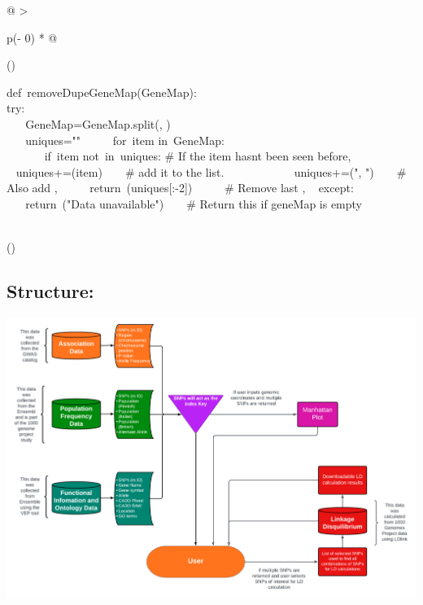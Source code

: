 \documentclass[12pt,a4paper]{article}
\begin{document}
\begin{longtable}[]{@{}
  >{\raggedright\arraybackslash}p{(\columnwidth - 0\tabcolsep) * }@{}}
\toprule()
\endhead
\begin{minipage}[t]{\linewidth}\raggedright
{def}{~removeDupeGeneMap(GeneMap):\\
\hspace*{0.333em} }{try}{:\\
\hspace*{0.333em} ~ ~ GeneMap=GeneMap.split(}{\textquotesingle,
\textquotesingle{}}{)\\
\hspace*{0.333em} ~ ~ uniques=}{""}{\hfill\break
~ ~ ~ }{for}{~item }{in}{~GeneMap:\\
\hspace*{0.333em} ~ ~ ~ ~ }{if}{~item }{not}{~}{in}{~uniques: }{\# If
the item hasn\textquotesingle t been seen before,}{\hfill\break
~ ~ ~ ~ ~ ~ ~ uniques+=(item) ~ ~ }{\# add it to the list.}{\hfill\break
~ ~ ~ ~ ~ ~ ~ uniques+=(}{", "}{) ~ ~ }{\# Also add \textquotesingle{}
,\textquotesingle{}}{\hfill\break
~ ~ ~ }{return}{~(uniques{[}:}{-2}{{]}) ~ ~ ~ }{\# Remove last
\textquotesingle{} ,\textquotesingle{}}{\hfill\break
~ }{except}{:\\
\hspace*{0.333em} ~ ~ }{return}{~(}{"Data unavailable"}{) ~ ~ }{\#
Return this if geneMap is empty}\strut
\end{minipage} \\
\bottomrule()
\end{longtable}

\hypertarget{h.vhchvtb4vp8x}{%
\subsection{\texorpdfstring{{}}{}}\label{h.vhchvtb4vp8x}}

\hypertarget{h.exepwhhdz8ou}{%
\subsection{\texorpdfstring{{Structure:}}{Structure:}}\label{h.exepwhhdz8ou}}

{\includegraphics{images/image4.png}}
\end{document}
